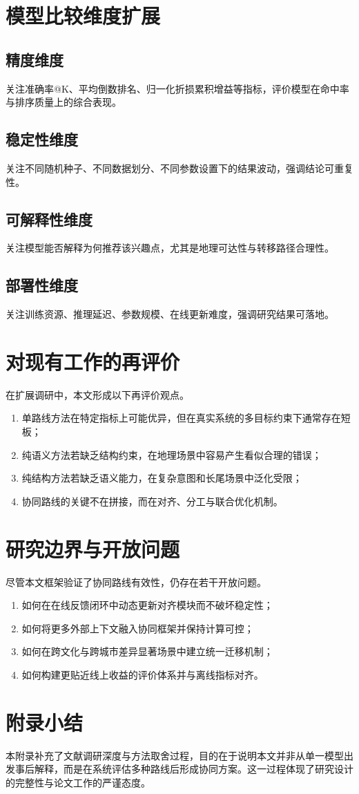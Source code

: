 \section{模型比较维度扩展}
\subsection{精度维度}
关注准确率@K、平均倒数排名、归一化折损累积增益等指标，评价模型在命中率与排序质量上的综合表现。

\subsection{稳定性维度}
关注不同随机种子、不同数据划分、不同参数设置下的结果波动，强调结论可重复性。

\subsection{可解释性维度}
关注模型能否解释为何推荐该兴趣点，尤其是地理可达性与转移路径合理性。

\subsection{部署性维度}
关注训练资源、推理延迟、参数规模、在线更新难度，强调研究结果可落地。

\section{对现有工作的再评价}
在扩展调研中，本文形成以下再评价观点。
\begin{enumerate}
    \item 单路线方法在特定指标上可能优异，但在真实系统的多目标约束下通常存在短板；
    \item 纯语义方法若缺乏结构约束，在地理场景中容易产生看似合理的错误；
    \item 纯结构方法若缺乏语义能力，在复杂意图和长尾场景中泛化受限；
    \item 协同路线的关键不在拼接，而在对齐、分工与联合优化机制。
\end{enumerate}

\section{研究边界与开放问题}
尽管本文框架验证了协同路线有效性，仍存在若干开放问题。
\begin{enumerate}
    \item 如何在在线反馈闭环中动态更新对齐模块而不破坏稳定性；
    \item 如何将更多外部上下文融入协同框架并保持计算可控；
    \item 如何在跨文化与跨城市差异显著场景中建立统一迁移机制；
    \item 如何构建更贴近线上收益的评价体系并与离线指标对齐。
\end{enumerate}

\section{附录小结}
本附录补充了文献调研深度与方法取舍过程，目的在于说明本文并非从单一模型出发事后解释，而是在系统评估多种路线后形成协同方案。这一过程体现了研究设计的完整性与论文工作的严谨态度。
